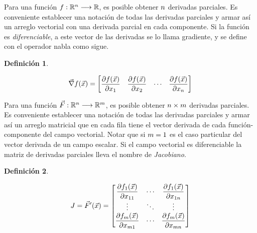 \documentclass[a5paper,12pt,twoside]{book}
\newtheorem{defn}{{Definición}}[chapter]
\begin{document}
Para una función $f:\mathbb{R}^n \longrightarrow \mathbb{R}$, es posible obtener $n$ derivadas parciales.
Es conveniente establecer una notación de todas las derivadas parciales y armar así un arreglo vectorial con una derivada parcial en cada componente.
Si la función es \emph{diferenciable}, a este vector de las derivadas se lo llama gradiente, y se define con el operador nabla como sigue.

\begin{mdframed}[style=DefinitionFrame]
    \begin{defn}
    \end{defn}
    \begin{equation*}
        \Vec{\nabla} f(\Vec{x}) = \begin{bmatrix} \dfrac{\partial f(\Vec{x})}{\partial x_1} & \dfrac{\partial f(\Vec{x})}{\partial x_2} & \cdots & \dfrac{\partial f(\Vec{x})}{\partial x_n} \end{bmatrix}
    \end{equation*}
\end{mdframed}

Para una función $\Vec{F}:\mathbb{R}^n \longrightarrow \mathbb{R}^m$, es posible obtener $n \times m$ derivadas parciales.
Es conveniente establecer una notación de todas las derivadas parciales y armar así un arreglo matricial que en cada fila tiene el vector derivada de cada función-componente del campo vectorial.
Notar que si $m=1$ es el caso particular del vector derivada de un campo escalar.
Si el campo vectorial es diferenciable la matriz de derivadas parciales lleva el nombre de \emph{Jacobiano}.

\begin{mdframed}[style=DefinitionFrame]
    \begin{defn}
    \end{defn}
    \begin{equation*}
        J = \Vec{F}'(\Vec{x}) = 
        \begin{bmatrix}
            \dfrac{\partial f_1(\Vec{x})}{\partial x_{11}} & \cdots & \dfrac{\partial f_1(\Vec{x})}{\partial x_{1n}}
            \\
            \vdots & \ddots & \vdots
            \\
            \dfrac{\partial f_m(\Vec{x})}{\partial x_{m 1}} & \cdots & \dfrac{\partial f_m(\Vec{x})}{\partial x_{mn}}
        \end{bmatrix}
    \end{equation*}
\end{mdframed}
\end{document}
